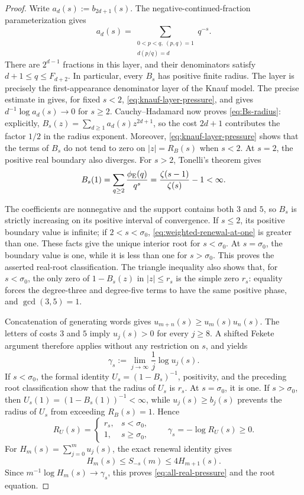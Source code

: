 \begin{proof}
Write \(a_d(s):=b_{2d+1}(s)\).  The negative-continued-fraction
parameterization gives
\[
 a_d(s)=\sum_{\substack{0<p<q,\ (p,q)=1\\d(p/q)=d}}q^{-s}.
\]
There are \(2^{d-1}\) fractions in this layer, and their denominators satisfy
\(d+1\le q\le F_{d+2}\).  In particular, every \(B_s\) has positive finite
radius.  The layer is precisely the first-appearance denominator layer of the
Knauf model.
 The precise estimate in  gives, for fixed
\(s<2\), \eqref{eq:knauf-layer-pressure}, and gives
\(d^{-1}\log a_d(s)\to0\) for \(s\ge2\).  Cauchy--Hadamard now proves
\eqref{eq:Bs-radius}: explicitly,
\(B_s(z)=\sum_{d\ge1}a_d(s)z^{2d+1}\), so the cost \(2d+1\) contributes the
factor \(1/2\) in the radius exponent.  Moreover,
\eqref{eq:knauf-layer-pressure} shows that
the terms of \(B_s\) do not tend to zero on \(|z|=R_B(s)\) when \(s<2\).
At \(s=2\), the positive real boundary also diverges.  For \(s>2\), Tonelli's
theorem gives
\begin{equation}
 B_s(1)=\sum_{q\ge2}\frac{\phi_{\rm E}(q)}{q^s}
 =\frac{\zeta(s-1)}{\zeta(s)}-1<\infty.
 \label{eq:weighted-renewal-at-one}
\end{equation}

The coefficients are nonnegative and the support contains both \(3\) and
\(5\), so \(B_s\) is strictly increasing on its positive interval of
convergence.  If \(s\le2\), its positive boundary value is infinite; if
\(2<s<\sigma_0\), \eqref{eq:weighted-renewal-at-one} is greater than one.
These facts give the unique interior root for \(s<\sigma_0\).  At
\(s=\sigma_0\), the boundary value is one, while it is less than one for
\(s>\sigma_0\).  This proves the asserted real-root classification.  The
triangle inequality also shows that, for \(s<\sigma_0\), the only zero of
\(1-B_s(z)\) in \(|z|\le r_s\) is the simple zero \(r_s\): equality forces
the degree-three and degree-five terms to have the same positive phase, and
\(\gcd(3,5)=1\).

Concatenation of generating words gives
\(u_{m+n}(s)\ge u_m(s)u_n(s)\).  The letters of costs \(3\) and \(5\) imply
\(u_j(s)>0\) for every \(j\ge8\).  A shifted Fekete argument therefore
applies without any restriction on \(s\), and yields
\[
 \gamma_s:=\lim_{j\to\infty}\frac1j\log u_j(s).
\]
If \(s<\sigma_0\), the formal identity
\(U_s=(1-B_s)^{-1}\), positivity, and the preceding root classification show
that the radius of \(U_s\) is \(r_s\).  At \(s=\sigma_0\), it is one.  If
\(s>\sigma_0\), then \(U_s(1)=(1-B_s(1))^{-1}<\infty\), while
\(u_j(s)\ge b_j(s)\) prevents the radius of \(U_s\) from exceeding
\(R_B(s)=1\).  Hence
\[
 R_U(s)=\begin{cases}r_s,&s<\sigma_0,\\1,&s\ge\sigma_0,
 \end{cases}
 \qquad \gamma_s=-\log R_U(s)\ge0.
\]
For \(H_m(s)=\sum_{j=0}^m u_j(s)\), the exact renewal identity gives
\[
 H_m(s)\le S_{-s}(m)\le4H_{m+1}(s).
\]
Since \(m^{-1}\log H_m(s)\to\gamma_s\), this proves
\eqref{eq:all-real-pressure} and the root equation.


\end{proof}
